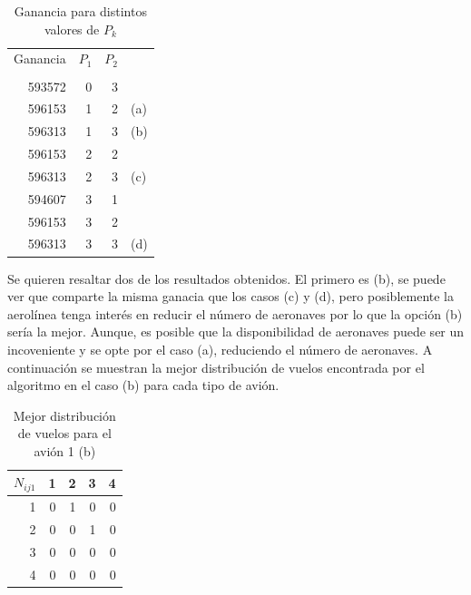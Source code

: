 \documentclass[12pt]{article}
\begin{document}
\begin{table}[ht!]
    \centering
    \begin{tabular}{r | r | r l}
            Ganancia  &   $P_1$  & $P_2$ & \\
            \vspace{-15pt}\\
            \cline{1-3}
            593572  & 0  & 3 & \\
            596153  & 1  & 2 & (a)\\
            596313  & 1  & 3 & (b)\\
            596153  & 2  & 2 & \\
            596313  & 2  & 3 & (c)\\
            594607  & 3  & 1 & \\
            596153  & 3  & 2 & \\
            596313  & 3  & 3 & (d)\\
    \end{tabular}
    \caption{Ganancia para distintos valores de $P_k$}
    \label{tab:ganancia}
\end{table}

Se quieren resaltar dos de los resultados obtenidos. El primero es (b), se puede ver que comparte la misma ganacia que los casos (c) y (d), pero posiblemente la aerolínea tenga interés en reducir el número de aeronaves por lo que la opción (b) sería la mejor. Aunque, es posible que la disponibilidad de aeronaves puede ser un incoveniente y se opte por el caso (a), reduciendo el número de aeronaves. A continuación se muestran la mejor distribución de vuelos encontrada por el algoritmo en el caso (b) para cada tipo de avión.

\begin{table}[ht!]
    \centering
    \begin{tabular}{r|r|r|r|r}
        $N_{ij1}$%
               &   1  &   2  &   3  &   4\\
            \hline
            \hline
             1 & 0 & 1 & 0 & 0\\
             2 & 0 & 0 & 1 & 0\\
             3 & 0 & 0 & 0 & 0\\
             4 & 0 & 0 & 0 & 0\\
    \end{tabular}
    \caption{Mejor distribución de vuelos para el avión 1 (b)}
    \label{tab:nij1b}
\end{table}
\end{document}
